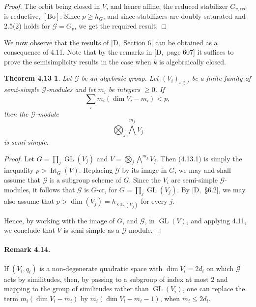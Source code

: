 \documentclass[11pt]{article}
\newcommand{\GL}{\operatorname{GL}}
\newcommand{\red}{\mathrm{red}}
\newcommand{\htG}{\operatorname{ht}_G}
\newtheorem*{theorem413}{Theorem 4.13}
\begin{document}
\begin{proof}
The orbit being closed in \(V\), and hence affine, the reduced stabilizer
\(G_{v,\red}\) is reductive, \([\mathrm{Bo}]\). Since \(p\ge h_G\), and since
stabilizers are doubly saturated and 2.5(2) holds for \(\mathcal G=G_v\), we get the
required result.
\end{proof}

We now observe that the results of \([\mathrm D,\) Section 6] can be obtained as a
consequence of 4.11. Note that by the remarks in \([\mathrm D,\) page 607] it suffices
to prove the semisimplicity results in the case when \(k\) is algebraically closed.

\begin{theorem413}
Let \(\mathcal G\) be an algebraic group. Let \((V_i)_{i\in I}\) be a finite family of
semi-simple \(\mathcal G\)-modules and let \(m_i\) be integers \(\ge0\). If
\begin{equation}
  \sum_i m_i(\dim V_i-m_i)<p,
  \tag{4.13.1}
\end{equation}
then the \(\mathcal G\)-module
\[
  \bigotimes_j \bigwedge^{m_j}V_j
\]
is semi-simple.
\end{theorem413}

\begin{proof}
Let \(G=\prod_j\GL(V_j)\) and \(V=\bigotimes_j\bigwedge^{m_j}V_j\). Then (4.13.1)
is simply the inequality \(p>\htG(V)\). Replacing \(\mathcal G\) by its image in
\(G\), we may and shall assume that \(\mathcal G\) is a subgroup scheme of \(G\).
Since the \(V_i\) are semi-simple \(\mathcal G\)-modules, it follows that
\(\mathcal G\) is \(G\)-cr, for \(G=\prod_j\GL(V_j)\). By \([\mathrm D,\) \S6.2],
we may also assume that \(p>\dim(V_j)=h_{\GL(V_j)}\) for every \(j\).

Hence, by working with the image of \(G\), and \(\mathcal G\), in \(\GL(V)\), and
applying 4.11, we conclude that \(V\) is semi-simple as a \(\mathcal G\)-module.
\end{proof}

\paragraph{Remark 4.14.}
If \((V_i,q_i)\) is a non-degenerate quadratic space with \(\dim V_i=2d_i\) on which
\(\mathcal G\) acts by similitudes, then, by passing to a subgroup of index at most
\(2\) and mapping to the group of similitudes rather than \(\GL(V_i)\), one can replace
the term \(m_i(\dim V_i-m_i)\) by \(m_i(\dim V_i-m_i-1)\), when \(m_i\le 2d_i\).
\end{document}
